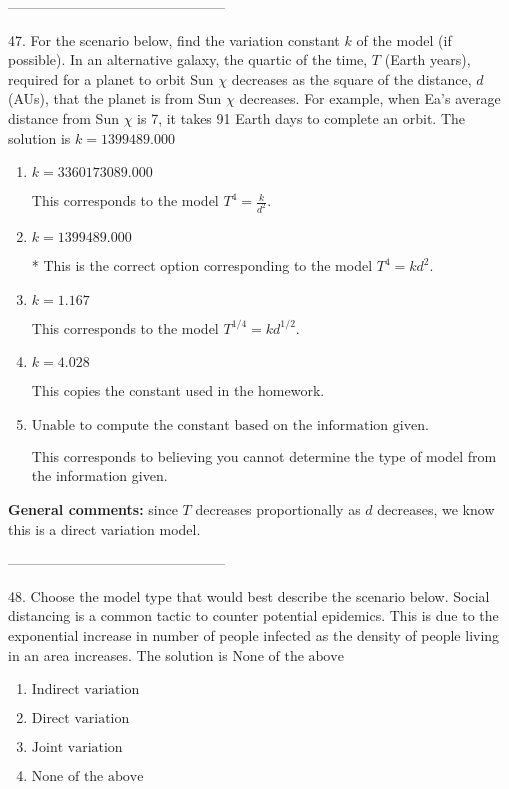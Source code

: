 \documentclass{extbook}[14pt]
\begin{document}
-----------------------------------------------

47. For the scenario below, find the variation constant $k$ of the model (if possible).
In an alternative galaxy, the quartic of the time, $T$ (Earth years), required for a planet to orbit Sun $\chi$ decreases as the square of the distance, $d$ (AUs), that the planet is from Sun $\chi$ decreases. For example, when Ea's average distance from Sun $\chi$ is 7, it takes 91 Earth days to complete an orbit. 
The solution is $ k = 1399489.000 $ 

\begin{enumerate}[label=\Alph*.] 
\item $ k = 3360173089.000 $ 

 This corresponds to the model $T^{4} = \frac{k}{d^{2}}$. 
\item $ k = 1399489.000 $ 

 * This is the correct option corresponding to the model $T^{4} = k d^{2}$. 
\item $ k = 1.167 $ 

 This corresponds to the model $T^{1/4} = k d^{1/2}$. 
\item $ k = 4.028 $ 

 This copies the constant used in the homework. 
\item $ \text{Unable to compute the constant based on the information given.} $ 

 This corresponds to believing you cannot determine the type of model from the information given. 
\end{enumerate} 
 
\textbf{General comments:} since $T$ decreases proportionally as $d$ decreases, we know this is a direct variation model.

-----------------------------------------------

48. Choose the model type that would best describe the scenario below.
Social distancing is a common tactic to counter potential epidemics. This is due to the exponential increase in number of people infected as the density of people living in an area increases. 
The solution is $ \text{None of the above} $ 

\begin{enumerate}[label=\Alph*.] 
\item $ \text{Indirect variation} $ 

  
\item $ \text{Direct variation} $ 

  
\item $ \text{Joint variation} $ 

  
\item $ \text{None of the above} $ 

  
\end{enumerate} 
 
\end{document}
